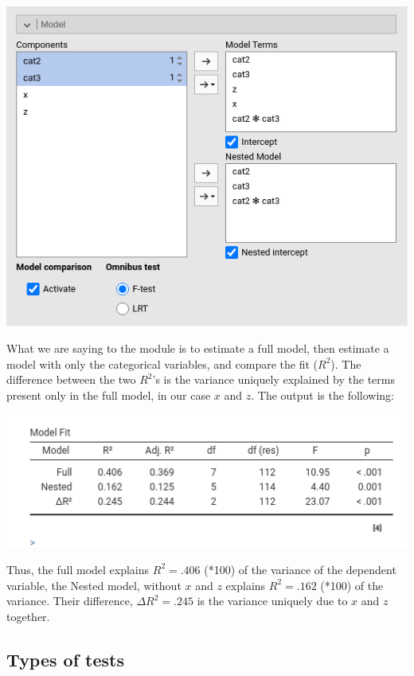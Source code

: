 \documentclass[
]{book}
\begin{document}
\includegraphics[width=7.92in]{bookletpics/2_modelcomparison_input2}

What we are saying to the module is to estimate a full model, then estimate a model with only the categorical variables, and compare the fit (\(R^2\)). The difference between the two \(R^2\)'s is the variance uniquely explained by the terms present only in the full model, in our case \(x\) and \(z\). The output is the following:

\includegraphics[width=6.88in]{bookletpics/2_modelcomparison_output2}

Thus, the full model explains \(R^2=.406\) (*100) of the variance of the dependent variable, the Nested model, without \(x\) and \(z\) explains \(R^2=.162\) (*100) of the variance. Their difference, \(\Delta R^2=.245\) is the variance uniquely due to \(x\) and \(z\) together.

\hypertarget{types-of-tests}{%
\subsection{Types of tests}\label{types-of-tests}}
\end{document}
